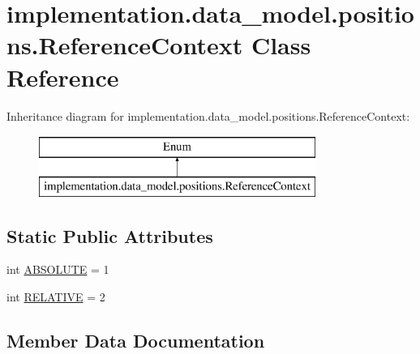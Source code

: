 \hypertarget{classimplementation_1_1data__model_1_1positions_1_1_reference_context}{}\section{implementation.\+data\+\_\+model.\+positions.\+Reference\+Context Class Reference}
\label{classimplementation_1_1data__model_1_1positions_1_1_reference_context}
Inheritance diagram for implementation.\+data\+\_\+model.\+positions.\+Reference\+Context\+:\begin{figure}[H]
\begin{center}
\leavevmode
\includegraphics[height=2.000000cm]{classimplementation_1_1data__model_1_1positions_1_1_reference_context}
\end{center}
\end{figure}
\subsection*{Static Public Attributes}
\begin{DoxyCompactItemize}
\item 
int \hyperlink{classimplementation_1_1data__model_1_1positions_1_1_reference_context_ab0986ecf93ba929730d3d423efead9a3}{A\+B\+S\+O\+L\+U\+TE} = 1
\item 
int \hyperlink{classimplementation_1_1data__model_1_1positions_1_1_reference_context_a5c7cbdfc4022cc8021d12add9213111f}{R\+E\+L\+A\+T\+I\+VE} = 2
\end{DoxyCompactItemize}


\subsection{Member Data Documentation}
\mbox{\label{classimplementation_1_1data__model_1_1positions_1_1_reference_context_ab0986ecf93ba929730d3d423efead9a3}} 

